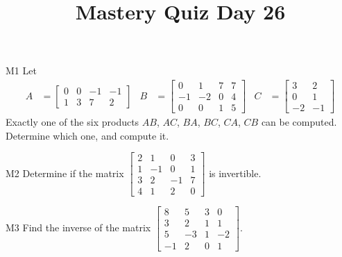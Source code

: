 \documentclass{sbgLAquiz}
\title{Mastery Quiz Day 26 }
\begin{document}
\begin{problem}{M1}
Let
\begin{align*}
A &= \begin{bmatrix} 0 & 0 & -1 & -1 \\ 1 & 3 & 7 & 2 \end{bmatrix} & B &= \begin{bmatrix} 0 & 1 & 7 & 7 \\ -1 & -2 & 0 & 4 \\ 0 & 0 & 1 & 5 \end{bmatrix} & C&=\begin{bmatrix} 3 & 2 \\ 0 & 1 \\ -2 & -1 \end{bmatrix}
\end{align*}
Exactly one of the six products $AB$, $AC$, $BA$, $BC$, $CA$, $CB$ can be computed.  Determine which one, and compute it.
\end{problem}

\begin{problem}{M2}
Determine if the matrix $\begin{bmatrix} 2 & 1 & 0 & 3 \\ 1 & -1 & 0 & 1 \\ 3 & 2 & -1 & 7 \\ 4 & 1 & 2 & 0 \end{bmatrix}$ is invertible.
\end{problem}
\newpage

\begin{problem}{M3}
Find the inverse of the matrix $\begin{bmatrix} 8 & 5 & 3 & 0 \\ 3 & 2 & 1 & 1 \\ 5 & -3 & 1 & -2 \\ -1 & 2 & 0 & 1\end{bmatrix} $.
\end{problem}
\end{document}
